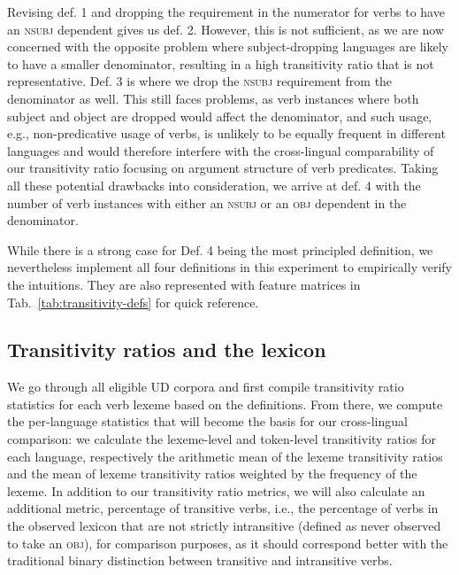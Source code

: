 Revising def. 1 and dropping the requirement in the numerator for verbs to have an \textsc{nsubj} dependent gives us def. 2. However, this is not sufficient, as we are now concerned with the opposite problem where subject-dropping languages are likely to have a smaller denominator, resulting in a high transitivity ratio that is not representative. Def. 3 is where we drop the \textsc{nsubj} requirement from the denominator as well. This still faces problems, as verb instances where both subject and object are dropped would affect the denominator, and such usage, e.g., non-predicative usage of verbs, is unlikely to be equally frequent in different languages and would therefore interfere with the cross-lingual comparability of our transitivity ratio focusing on argument structure of verb predicates. Taking all these potential drawbacks into consideration, we arrive at def. 4 with the number of verb instances with either an \textsc{nsubj} or an \textsc{obj} dependent in the denominator. 



While there is a strong case for Def. 4 being the most principled definition, we nevertheless implement all four definitions in this experiment to empirically verify the intuitions. They are also represented with feature matrices in Tab.~\ref{tab:transitivity-defs} for quick reference.

\subsection{Transitivity ratios and the lexicon}

We go through all eligible UD corpora and first compile transitivity ratio statistics for each verb lexeme based on the definitions. From there, we compute the per-language statistics that will become the basis for our cross-lingual comparison: we calculate the lexeme-level and token-level transitivity ratios for each language, respectively the arithmetic mean of the lexeme transitivity ratios and the mean of lexeme transitivity ratios weighted by the frequency of the lexeme. In addition to our transitivity ratio metrics, we will also calculate an additional metric, percentage of transitive verbs, i.e., the percentage of verbs in the observed lexicon that are not strictly intransitive (defined as never observed to take an \textsc{obj}), for comparison purposes, as it should correspond better with the traditional binary distinction between transitive and intransitive verbs.

